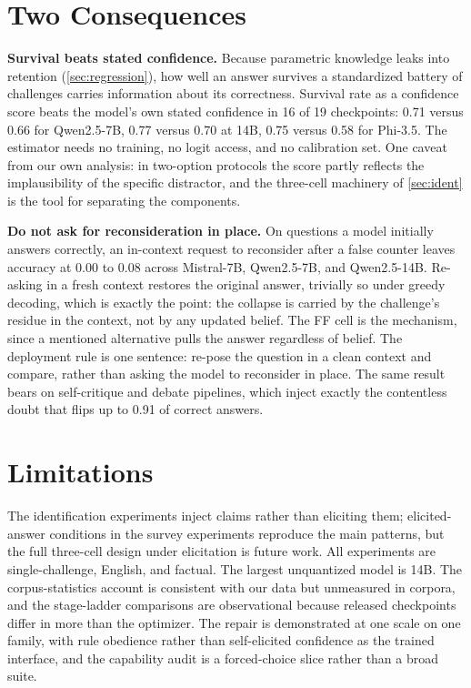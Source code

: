\documentclass{article}
\begin{document}
\section{Two Consequences}
\label{sec:uses}

\textbf{Survival beats stated confidence.} Because parametric knowledge leaks into retention (\cref{sec:regression}), how well an answer survives a standardized battery of challenges carries information about its correctness. Survival rate as a confidence score beats the model's own stated confidence in 16 of 19 checkpoints: 0.71 versus 0.66 for Qwen2.5-7B, 0.77 versus 0.70 at 14B, 0.75 versus 0.58 for Phi-3.5. The estimator needs no training, no logit access, and no calibration set. One caveat from our own analysis: in two-option protocols the score partly reflects the implausibility of the specific distractor, and the three-cell machinery of \cref{sec:ident} is the tool for separating the components.

\textbf{Do not ask for reconsideration in place.} On questions a model initially answers correctly, an in-context request to reconsider after a false counter leaves accuracy at 0.00 to 0.08 across Mistral-7B, Qwen2.5-7B, and Qwen2.5-14B. Re-asking in a fresh context restores the original answer, trivially so under greedy decoding, which is exactly the point: the collapse is carried by the challenge's residue in the context, not by any updated belief. The FF cell is the mechanism, since a mentioned alternative pulls the answer regardless of belief. The deployment rule is one sentence: re-pose the question in a clean context and compare, rather than asking the model to reconsider in place. The same result bears on self-critique and debate pipelines, which inject exactly the contentless doubt that flips up to 0.91 of correct answers.

\section{Limitations}
\label{sec:limits}

The identification experiments inject claims rather than eliciting them; elicited-answer conditions in the survey experiments reproduce the main patterns, but the full three-cell design under elicitation is future work. All experiments are single-challenge, English, and factual. The largest unquantized model is 14B. The corpus-statistics account is consistent with our data but unmeasured in corpora, and the stage-ladder comparisons are observational because released checkpoints differ in more than the optimizer. The repair is demonstrated at one scale on one family, with rule obedience rather than self-elicited confidence as the trained interface, and the capability audit is a forced-choice slice rather than a broad suite.
\end{document}
